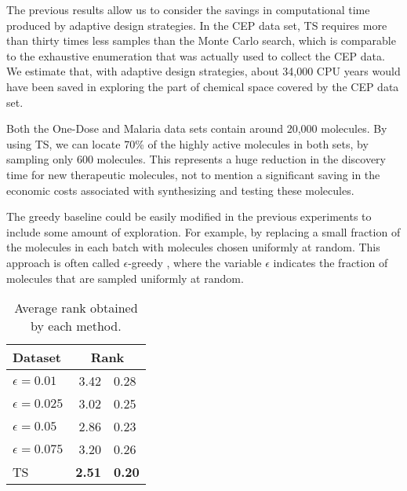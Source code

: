 The previous results allow us to consider the savings in computational time produced by adaptive design strategies. In the CEP data set, TS requires more than thirty times less samples than the Monte Carlo search, which is comparable to the exhaustive enumeration that was actually used to collect the CEP data. We estimate that, with adaptive design strategies, about 34,000 CPU years would have been saved in exploring the part of chemical space covered by the CEP data set. 

Both the One-Dose and Malaria data sets contain around 20,000 molecules. By using TS, we can locate 70\% of the highly active molecules in both sets, by sampling only 600 molecules. This represents a huge reduction in the discovery time for new therapeutic molecules, not to mention a significant saving in the economic costs associated with synthesizing and testing these molecules.

The greedy baseline could be easily modified in the previous experiments to include some amount of exploration. For example, by replacing a small fraction of the molecules in each batch with molecules chosen uniformly at random. This approach is often called $\epsilon$-greedy \cite{watkins1989learning}, where the variable $\epsilon$ indicates the fraction of molecules that are sampled uniformly at random.

\begin{table}
\centering
\caption{Average rank obtained by each method.}\label{tab:results_epsilon_greedy}
\begin{tabular}{lr@{$\pm$}l}
\hline
\bf{Dataset}& \multicolumn{2}{c}{\bf{Rank}}\\
\hline
$\epsilon = 0.01$ & 3.42 & 0.28 \\
$\epsilon = 0.025$ & 3.02 & 0.25 \\
$\epsilon = 0.05$ & 2.86 & 0.23 \\
$\epsilon = 0.075$ & 3.20 & 0.26 \\
TS & \bf{ 2.51 }&\bf{ 0.20 } \\
\hline
\end{tabular}
\end{table}
